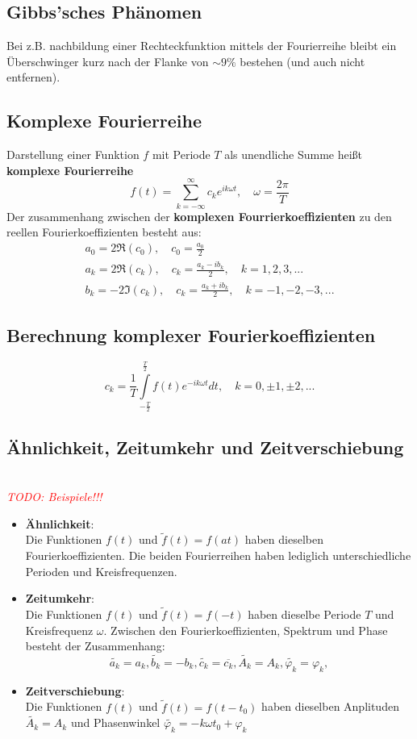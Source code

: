\documentclass[12pt]{article}
\newcommand\todo[1]{\textit{\textcolor{red}{\\TODO: #1}}}
\begin{document}
\subsection{Gibbs'sches Phänomen}
Bei z.B. nachbildung einer Rechteckfunktion mittels der Fourierreihe bleibt ein Überschwinger kurz nach der Flanke von $\sim 9\%$ bestehen (und auch nicht entfernen).
\subsection{Komplexe Fourierreihe}
Darstellung einer Funktion $f$ mit Periode $T$ als unendliche Summe heißt \textbf{komplexe Fourierreihe}
\begin{equation*}
	f(t) = \sum\limits_{k=-\infty}^{\infty}c_ke^{ik\omega t}, \quad \omega=\frac{2\pi}{T}
\end{equation*}
Der zusammenhang zwischen der \textbf{komplexen Fourrierkoeffizienten} zu den reellen Fourierkoeffizienten besteht aus:
\begin{gather*}
	a_0=2\Re(c_0), \quad c_0=\frac{a_0}{2}\\
	a_k=2\Re(c_k), \quad c_k=\frac{a_k-ib_k}{2}, \quad k=1,2,3,...\\
	b_k=-2\Im(c_k), \quad c_k=\frac{a_k+ib_k}{2}, \quad k=-1,-2,-3,...
\end{gather*}
\subsection{Berechnung komplexer Fourierkoeffizienten}
\begin{equation*}
	c_k=\frac{1}{T}\int\limits_{-\frac{T}{2}}^{\frac{T}{2}}f(t)e^{-ik\omega t}dt, \quad k=0,\pm1,\pm2,...
\end{equation*}
\subsection{Ähnlichkeit, Zeitumkehr und Zeitverschiebung}
\todo{Beispiele!!!}
\begin{itemize}
	\item \textbf{Ähnlichkeit}:\\
			Die Funktionen $f(t)$ und $\tilde{f}(t)=f(at)$ haben dieselben Fourierkoeffizienten. Die beiden Fourierreihen haben lediglich unterschiedliche Perioden und Kreisfrequenzen.
	\item \textbf{Zeitumkehr}:\\
			Die Funktionen $f(t)$ und $\tilde{f}(t)=f(-t)$ haben dieselbe Periode $T$ und Kreisfrequenz $\omega$. Zwischen den Fourierkoeffizienten, Spektrum und Phase besteht der Zusammenhang:
			\begin{equation*}
				\tilde{a_k}=a_k,\tilde{b_k}=-b_k,\tilde{c_k}=\overline{c_k},\tilde{A_k}=A_k,\tilde{\varphi_k}=\varphi_k, 
			\end{equation*}
	\item\textbf{Zeitverschiebung}:\\
			Die Funktionen $f(t)$ und $\tilde{f}(t)=f(t-t_0)$ haben dieselben Anplituden $\tilde{A_k}=A_k$ und Phasenwinkel $\tilde{\varphi_k}=-k\omega t_0 + \varphi_k$
\end{itemize}
\end{document}
